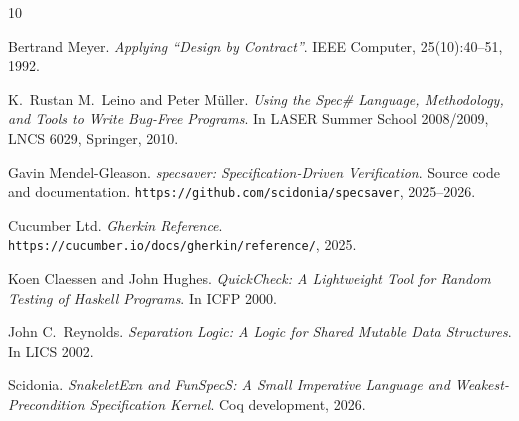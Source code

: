 \documentclass[11pt,a4paper]{article}
\begin{document}
\begin{thebibliography}{10}

Bertrand Meyer.
\textit{Applying ``Design by Contract''}.
IEEE Computer, 25(10):40--51, 1992.

K.\ Rustan M.\ Leino and Peter M\"uller.
\textit{Using the Spec\# Language, Methodology, and Tools to Write
Bug-Free Programs}.
In LASER Summer School 2008/2009, LNCS 6029, Springer, 2010.

Gavin Mendel-Gleason.
\textit{specsaver: Specification-Driven Verification}.
Source code and documentation. \texttt{https://github.com/scidonia/specsaver}, 2025--2026.

Cucumber Ltd.
\textit{Gherkin Reference}.
\texttt{https://cucumber.io/docs/gherkin/reference/}, 2025.

Koen Claessen and John Hughes.
\textit{QuickCheck: A Lightweight Tool for Random Testing of Haskell Programs}.
In ICFP 2000.

John C.\ Reynolds.
\textit{Separation Logic: A Logic for Shared Mutable Data Structures}.
In LICS 2002.

Scidonia.
\textit{SnakeletExn and FunSpecS: A Small Imperative Language and
Weakest-Precondition Specification Kernel}.
Coq development, 2026.

\end{thebibliography}
\end{document}
